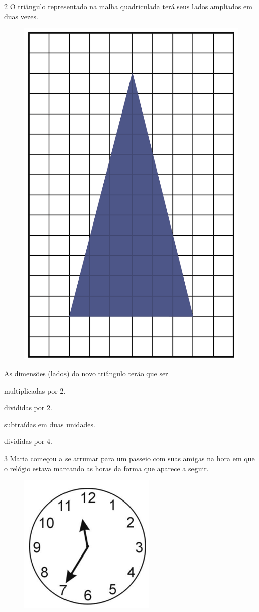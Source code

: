 \pagebreak
\num{2} O triângulo representado na malha quadriculada terá seus lados ampliados em duas vezes.

\begin{figure}[htpb!]
\centering
\includegraphics[width=.6\textwidth]{../ilustracoes/MAT5/SAEB_5ANO_MAT_figura47.png}
\end{figure}

As dimensões (lados) do novo triângulo terão que ser

\begin{minipage}{.5\textwidth}
\begin{escolha}
\item
  multiplicadas por 2.
\item
  divididas por 2.
\item
  subtraídas em duas unidades.
\item
  divididas por 4.
\end{escolha}
\end{minipage}


\pagebreak
\num{3} Maria começou a se arrumar para um passeio com suas amigas na hora
em que o relógio estava marcando as horas da forma que aparece a seguir.

\begin{figure}[htpb!]
\centering
\includegraphics[width=.5\textwidth]{./imgs/mat9.png}
\end{figure}

